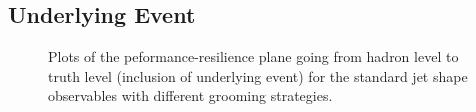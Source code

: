 \documentclass[11pt]{cernrep}
\begin{document}
\subsection{Underlying Event}\label{jetsub_2prong_sec:UE}


\begin{figure}
  \caption{Plots of the peformance-resilience plane going from hadron level to truth level (inclusion of underlying event) for the standard jet shape observables with different grooming strategies.}\label{jetsub_2prong_fig:grooming-UE}
\end{figure}
\end{document}
